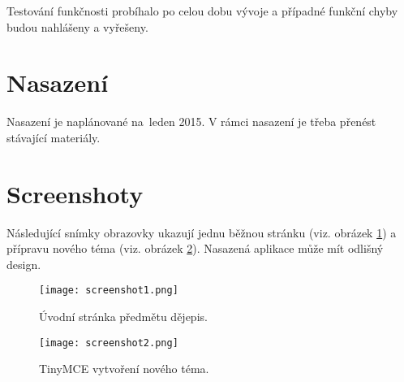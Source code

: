 \documentclass[thesis=B,czech]{FITthesis}[2012/06/26]
\begin{document}
Testování funkčnosti probíhalo po celou dobu vývoje a případné funkční chyby budou nahlášeny a vyřešeny.

\section{Nasazení}

Nasazení je naplánované na~leden 2015. V rámci nasazení je třeba přenést stávající materiály.

\section{Screenshoty}

Následující snímky obrazovky ukazují jednu běžnou stránku (viz. obrázek \ref{fig:screenshot1}) a přípravu nového téma (viz. obrázek \ref{fig:screenshot2}). Nasazená aplikace může mít odlišný design.

\begin{figure}
  \centering
	\texttt{[image: screenshot1.png]}
	\caption{Úvodní stránka předmětu dějepis.} \label{fig:screenshot1} 
\end{figure}


\begin{figure}
  \centering
	\texttt{[image: screenshot2.png]}
	\caption{TinyMCE vytvoření nového téma.} \label{fig:screenshot2} 
\end{figure}
\end{document}
